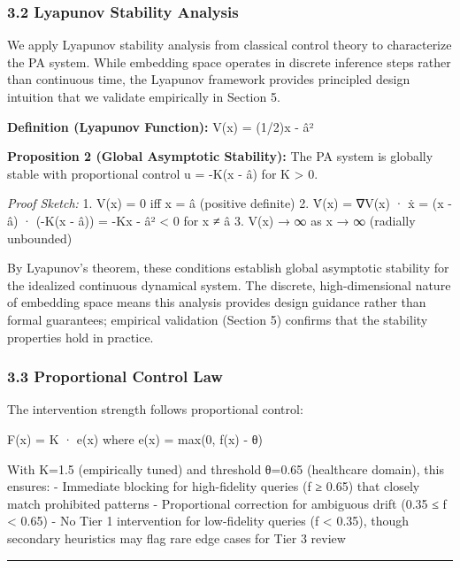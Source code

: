 \subsubsection{3.2 Lyapunov Stability
Analysis}\label{lyapunov-stability-analysis}

We apply Lyapunov stability analysis from classical control theory to
characterize the PA system. While embedding space operates in discrete
inference steps rather than continuous time, the Lyapunov framework
provides principled design intuition that we validate empirically in
Section 5.

\textbf{Definition (Lyapunov Function):} V(x) = (1/2)\textbar\textbar x
- â\textbar\textbar²

\textbf{Proposition 2 (Global Asymptotic Stability):} The PA system is
globally stable with proportional control u = -K(x - â) for K
\textgreater{} 0.

\emph{Proof Sketch:} 1. V(x) = 0 iff x = â (positive definite) 2. V̇(x) =
∇V(x) · ẋ = (x - â) · (-K(x - â)) = -K\textbar\textbar x -
â\textbar\textbar² \textless{} 0 for x ≠ â 3. V(x) → ∞ as
\textbar\textbar x\textbar\textbar{} → ∞ (radially unbounded)

By Lyapunov's theorem, these conditions establish global asymptotic
stability for the idealized continuous dynamical system. The discrete,
high-dimensional nature of embedding space means this analysis provides
design guidance rather than formal guarantees; empirical validation
(Section 5) confirms that the stability properties hold in practice.

\subsubsection{3.3 Proportional Control
Law}\label{proportional-control-law}

The intervention strength follows proportional control:

F(x) = K · e(x) where e(x) = max(0, f(x) - θ)

With K=1.5 (empirically tuned) and threshold θ=0.65 (healthcare domain),
this ensures: - Immediate blocking for high-fidelity queries (f ≥ 0.65)
that closely match prohibited patterns - Proportional correction for
ambiguous drift (0.35 ≤ f \textless{} 0.65) - No Tier 1 intervention for
low-fidelity queries (f \textless{} 0.35), though secondary heuristics
may flag rare edge cases for Tier 3 review

\begin{center}\rule{0.5\linewidth}{0.5pt}\end{center}

